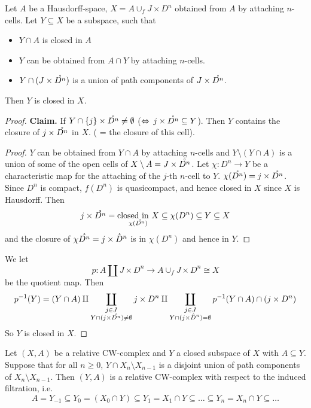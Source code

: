 \documentclass{TemplateLecture}
\begin{document}
\begin{proposition}
    Let \(A\) be a Hausdorff-space, \(X = A \cup_f J\times D^n\) obtained from \(A\) by attaching \(n\)-cells. Let \(Y \subseteq X\) be a subspace, such that
    \begin{itemize}
        \item \(Y \cap A\) is closed in \(A\)
        \item \(Y\) can be obtained from \(A \cap Y\) by attaching \(n\)-cells.
        \item \(Y \cap (J\times \mathring{D^n})\) is a union of path components of \(J\times \mathring{D^n}\).
    \end{itemize}
    Then \(Y\) is closed in \(X\).
\end{proposition}

\begin{proof}
    \textbf{Claim.} If \(Y \cap \{j\} \times \mathring{D^n} \neq \emptyset\) (\(\Leftrightarrow\) \(j\times \mathring{D^n} \subseteq Y\)).
    Then \(Y\) contains the closure of \(j\times \mathring{D^n}\) in \(X\). ( = the closure of this cell).
    \begin{proof}
        \(Y\) can be obtained from \(Y \cap A\) by attaching \(n\)-cells and \(Y\setminus (Y\cap A)\) is a union of some of the open cells of \(X\setminus A = J\times \mathring{D^n}\). Let \(\chi \colon D^n \to Y\) be a characteristic map for the attaching of the \(j\)-th \(n\)-cell to \(Y\).
        \(\chi(\mathring{D^n}) = j \times \mathring{D^n}\). Since \(D^n\) is compact, \(f(D^n)\) is quasicompact, and hence closed in \(X\) since \(X\) is Hausdorff. Then
        \[j\times \mathring{D^n} = \underset{\chi(\mathring{D^n})}{\text{closed in } X} \subseteq \chi(D^n) \subseteq Y \subseteq X\]
        and the closure of \(\chi\mathring{D^n} = j \times \mathring{D}^n\) is in \(\chi(D^n)\) and hence in \(Y\).  
    \end{proof}
    We let
    \[p\colon A \amalg J\times D^n \to A \cup_f J\times D^n \cong X\]
    be the quotient map. Then 
    \[p^{-1}(Y) = (Y\cap A) \amalg \coprod_{\substack{j \in J \\ Y \cap (j\times \mathring{D^n}) \neq \emptyset}} j\times D^n \amalg \coprod_{\substack{j \in J \\ Y\cap (j\times \mathring{D}^n) = \emptyset}} p^{-1}(Y\cap A) \cap (j\times D^n)\]
    So \(Y\) is closed in \(X\).
\end{proof}

\begin{thm}{}{}
    Let \((X,A)\) be a relative CW-complex and \(Y\) a closed subspace of \(X\) with \(A \subseteq Y\). Suppose that for all \(n \geq 0\), \(Y \cap X_n \setminus X_{n-1}\) is a disjoint union of path components of \(X_n \setminus X_{n-1}\). Then \((Y, A)\) is a relative CW-complex with respect to the induced filtration, i.e.
    \[A = Y_{-1} \subseteq Y_0 = (X_0 \cap Y) \subseteq Y_1 = X_1 \cap Y \subseteq \dots \subseteq Y_n = X_n \cap Y \subseteq \dots \]
\end{thm}
\end{document}

